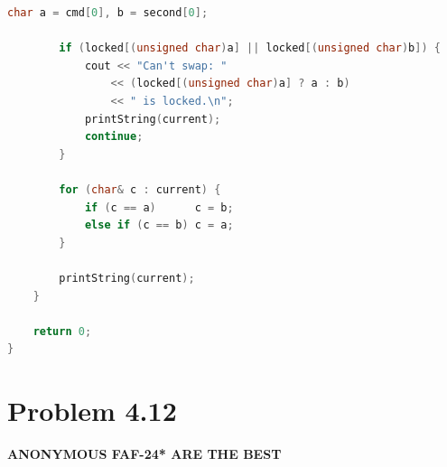 \documentclass[12pt]{article}
\begin{document}
\begin{lstlisting}[language=C++]
        char a = cmd[0], b = second[0];

        if (locked[(unsigned char)a] || locked[(unsigned char)b]) {
            cout << "Can't swap: "
                << (locked[(unsigned char)a] ? a : b)
                << " is locked.\n";
            printString(current);
            continue;
        }

        for (char& c : current) {
            if (c == a)      c = b;
            else if (c == b) c = a;
        }

        printString(current);
    }

    return 0;
}
\end{lstlisting}

\section*{Problem 4.12}
\textbf{ANONYMOUS FAF-24* ARE THE BEST}
\end{document}
